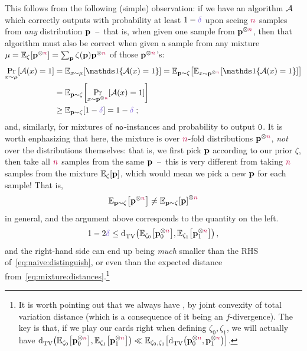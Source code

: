 This follows from the following (simple) observation: if we have an algorithm $\mathcal{A}$ which correctly outputs \accept with probability at least $1-\errprob$ upon seeing ${\textcolor{purple}{n}}$ samples from \emph{any} distribution $\mathbf{p}$~--~that is, when given one sample from $\mathbf{p}^{\otimes{\textcolor{purple}{n}}}$, then that algorithm must also be correct when given a sample from any mixture $\mu = \bE{\zeta}{\p^{\otimes\ns}}=\sum_{\p}\zeta(\p)\p^{\otimes\ns}$ of those $\mathbf{p}^{\otimes{\textcolor{purple}{n}}}$'s:
\begin{align*}
	\bP{x\sim\mu}{\Algo(x)=\accept}
	&= \bE{x\sim\mu}{\indic{\Algo(x)=\accept}}
	= \bE{\p\sim\zeta}{\bE{x\sim\p^{\otimes\ns}}{\indic{\Algo(x)=\accept}}}\\
	&= \bE{\p\sim\zeta}{\bP{x\sim\p^{\otimes\ns}}{\Algo(x)=\accept}}\\
	&\geq \bE{\p\sim\zeta}{1-\errprob} = 1-\errprob\;;
\end{align*}
and, similarly, for mixtures of ${\sf{}no}$-instances and probability to output $0$. It is worth enphasizing that here, the mixture is over ${\textcolor{purple}{n}}$-fold distributions $\mathbf{p}^{\otimes{\textcolor{purple}{n}}}$, \emph{not} over the distributions themselves: that is, we first pick $\mathbf{p}$ according to our prior $\zeta$, then take all ${\textcolor{purple}{n}}$ samples from the same $\mathbf{p}$~--~this is very different from taking ${\textcolor{purple}{n}}$ samples from the mixture $\bE{\zeta}{\p}$, which would mean we pick a new $\mathbf{p}$ for each sample! That is,
\begin{equation}
	\bE{\p\sim\zeta}{\p^{\otimes\ns}} \neq \bE{\p\sim\zeta}{\p}^{\otimes\ns}
\end{equation}
in general, and the argument above corresponds to the quantity on the left. 
\begin{equation}
	\label{eq:lecam}
	1-2\errprob \leq \totalvardist{\bE{\zeta_\reject}{\p_\reject^{\otimes\ns}}}{\bE{\zeta_\accept}{\p_\accept^{\otimes\ns}}}\,,
\end{equation}
and the right-hand side can end up being \emph{much} smaller than the RHS of~\cref{eq:naive:distinguish}, or even than the expected distance from~\cref{eq:mixture:distances}.\footnote{It is worth pointing out that we always have , by joint convexity of total variation distance (which is a consequence of it being an $f$-divergence). The key is that, if we play our cards right when defining $\zeta_0,\zeta_1$, we will actually have
$\totalvardist{\bE{\zeta_\reject}{\p_\reject^{\otimes\ns}}}{\bE{\zeta_\accept}{\p_\accept^{\otimes\ns}}} \ll \bE{\zeta_\reject,\zeta_\accept}{\totalvardist{\p_0^{\otimes\ns}}{\p_1^{\otimes\ns}}}$.}

